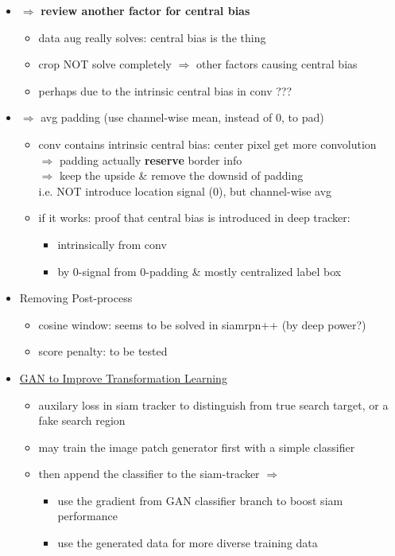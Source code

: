 \begin{itemize}
\begin{itemize}
	\item $\Rightarrow$ \textbf{review another factor for central bias}
		\begin{itemize}
		\item data aug really solves: central bias is the thing
		\item crop NOT solve completely $\Rightarrow$ other factors causing central bias
		\item perhaps due to the intrinsic central bias in conv ???
		\end{itemize}
	\item $\Rightarrow$ avg padding (use channel-wise mean, instead of 0, to pad)
		\begin{itemize}
		\item conv contains intrinsic central bias: center pixel get more convolution \\
		$\Rightarrow$ padding actually \textbf{reserve} border info \\
		$\Rightarrow$ keep the upside \& remove the downsid of padding \\
		i.e. NOT introduce location signal (0), but channel-wise avg
		\item if it works: proof that central bias is introduced in deep tracker:
			\begin{itemize}
			\item intrinsically from conv
			\item by 0-signal from 0-padding \& mostly centralized label box
			\end{itemize}
		\end{itemize}
	\item Removing Post-process
		\begin{itemize}
		\item cosine window: seems to be solved in siamrpn++ (by deep power?)
		\item score penalty: to be tested
		\end{itemize}
	\item \underline{GAN to Improve Transformation Learning}
		\begin{itemize}
		\item auxilary loss in siam tracker to distinguish from true search target, or a fake search region
		\item may train the image patch generator first with a simple classifier
		\item then append the classifier to the siam-tracker $\Rightarrow$
			\begin{itemize}
			\item use the gradient from GAN classifier branch to boost siam performance
			\item use the generated data for more diverse training data
			\end{itemize}
		\end{itemize}
	\end{itemize}
\end{itemize}


